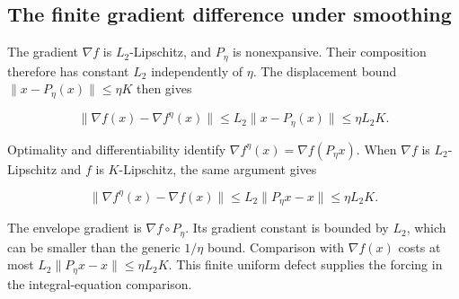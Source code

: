 \documentclass[11pt,a4paper]{report}
\begin{document}
\subsection{\texorpdfstring{The finite gradient difference under smoothing}{The finite gradient difference under smoothing}}
\label{report-step-ProximalLangevin-MeanFieldSmoothing-lean-2}


The gradient \(\nabla f\) is \(L_2\)-Lipschitz, and \(P_\eta\) is nonexpansive. Their composition therefore has constant \(L_2\) independently of \(\eta\). The displacement bound \(\|x-P_\eta(x)\|\le\eta K\) then gives

\[\|\nabla f(x)-\nabla f^\eta(x)\|\le L_2\|x-P_\eta(x)\|\le\eta L_2K.\]

Optimality and differentiability identify \(\nabla f^\eta(x)=\nabla f(P_\eta x)\). When \(\nabla f\) is \(L_2\)-Lipschitz and \(f\) is \(K\)-Lipschitz, the same argument gives

\[\|\nabla f^\eta(x)-\nabla f(x)\|\le L_2\|P_\eta x-x\|\le\eta L_2K.\]

The envelope gradient is \(\nabla f\circ P_\eta\). Its gradient constant is bounded by \(L_2\), which can be smaller than the generic \(1/\eta\) bound. Comparison with \(\nabla f(x)\) costs at most \(L_2\|P_\eta x-x\|\le\eta L_2K\). This finite uniform defect supplies the forcing in the integral-equation comparison.
\end{document}
